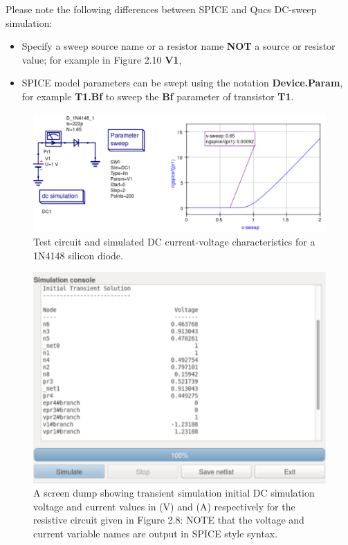 \documentclass[10pt, a4paper]{report}
\begin{document}
 Please note the following differences between SPICE and Qucs DC-sweep simulation: 
\begin{itemize}
	\item {Specify a sweep source name or a resistor name \textbf{NOT} a source or resistor value; for example in Figure 2.10 \textbf{V1}, }
	\item {SPICE model parameters can be swept using the notation \textbf{Device.Param}, for example  \textbf{T1.Bf} to sweep the\textbf{ Bf} parameter of transistor \textbf{T1}. }
\end{itemize}
 \begin{figure}[h]
	\centering
	\includegraphics[width=16cm]{pics/chap2/Diode_DC.pdf}
	\caption{Test circuit and simulated DC current-voltage characteristics for a 1N4148 silicon diode.}
	\label{Fig18}
\end{figure}
 \begin{figure}[h]
	\centering
	\includegraphics[width=12cm]{pics/chap2/tran_DC_list.pdf}
	\caption{A screen dump showing transient simulation initial DC simulation voltage and current values in (V) and (A) respectively for the resistive circuit given in Figure 2.8: NOTE that the voltage and current variable names are output in SPICE style syntax.}
	\label{Fig17}
\end{figure}
\end{document}
